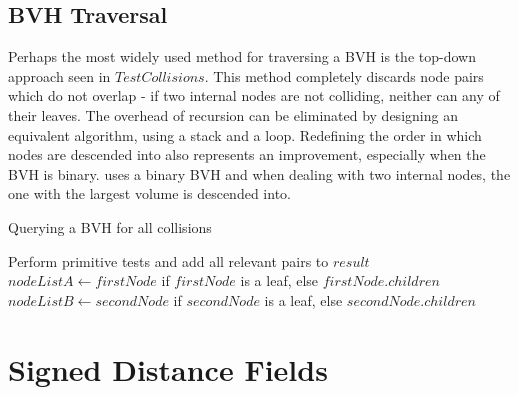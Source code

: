 \subsection{BVH Traversal}
\label{sub-sec:traversal}

Perhaps the most widely used method for traversing a BVH is the top-down approach seen in \hyperref[alg:BVHQuery]{$TestCollisions$}. This method completely discards node pairs which do not overlap - if two internal nodes are not colliding, neither can any of their leaves. The overhead of recursion can be eliminated by designing an equivalent algorithm, using a stack and a loop. Redefining the order in which nodes are descended into also represents an improvement, especially when the BVH is binary. \citep{vdb97} uses a binary BVH and when dealing with two internal nodes, the one with the largest volume is descended into.

\begin{algorithm}
	\label{alg:BVHQuery}
	\caption{Querying a BVH for all collisions}
	\begin{algorithmic}[1]
				\State Perform primitive tests and add all relevant pairs to $result$		
			\Else
				\State $nodeListA \gets firstNode$ if $firstNode$ is a leaf, else $firstNode.children$
				\State $nodeListB \gets secondNode$ if $secondNode$ is a leaf, else $secondNode.children$
					\State {}
				\EndFor
			\EndIf
		\EndIf
		\EndProcedure
	\end{algorithmic}
\end{algorithm}


\FloatBarrier
\section{Signed Distance Fields}
\label{sec:sdf}



